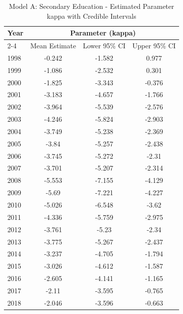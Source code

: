 \begin{landscape}
\begin{table}[htbp]
\centering
\caption{Model A: Secondary Education - Estimated Parameter kappa  with Credible Intervals}
\label{tab:Fparameters_k3}
\begin{tabular}{@{}lccc@{}}
\toprule
Year & \multicolumn{3}{c}{Parameter (kappa)} \\
\cmidrule(lr){2-4}
      & Mean Estimate & Lower 95\% CI & Upper 95\% CI \\
\midrule
1998 & -0.242 & -1.582 & 0.977 \\
1999 & -1.086 & -2.532 & 0.301 \\
2000 & -1.825 & -3.343 & -0.376 \\
2001 & -3.183 & -4.657 & -1.766 \\
2002 & -3.964 & -5.539 & -2.576 \\
2003 & -4.246 & -5.824 & -2.903 \\
2004 & -3.749 & -5.238 & -2.369 \\
2005 & -3.84 & -5.257 & -2.438 \\
2006 & -3.745 & -5.272 & -2.31 \\
2007 & -3.701 & -5.207 & -2.314 \\
2008 & -5.553 & -7.155 & -4.129 \\
2009 & -5.69 & -7.221 & -4.227 \\
2010 & -5.026 & -6.548 & -3.62 \\
2011 & -4.336 & -5.759 & -2.975 \\
2012 & -3.761 & -5.23 & -2.34 \\
2013 & -3.775 & -5.267 & -2.437 \\
2014 & -3.237 & -4.705 & -1.794 \\
2015 & -3.026 & -4.612 & -1.587 \\
2016 & -2.605 & -4.141 & -1.165 \\
2017 & -2.11 & -3.595 & -0.765 \\
2018 & -2.046 & -3.596 & -0.663 \\
\bottomrule
\end{tabular}
\end{table}
\end{landscape}